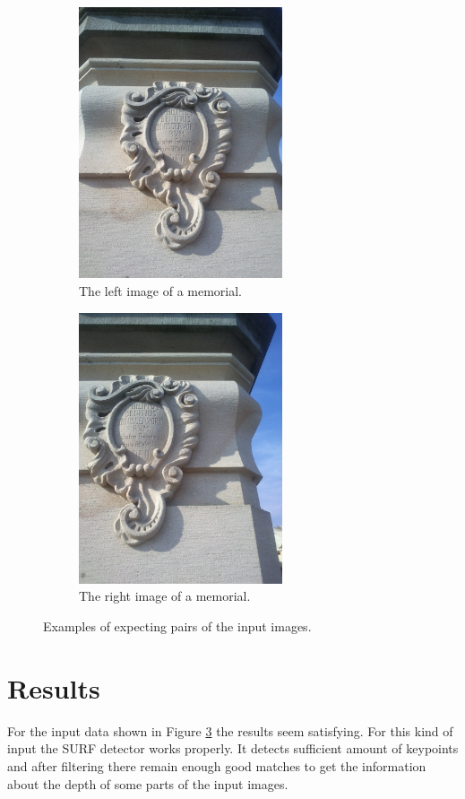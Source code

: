\begin{figure}[H]
\begin{subfigure}[b]{0.45\textwidth}
\centering
\includegraphics[width=6.0cm]{img/memorial_a.png}
\caption{The left image of a memorial.} \label{3}
\end{subfigure}
\begin{subfigure}[b]{0.45\textwidth}
\centering
\includegraphics[width=6.0cm]{img/memorial_b.png}
\caption{The right image of a memorial.} \label{4}
\end{subfigure}

\caption[]{Examples of expecting pairs of the input images.} 
\label{fig:input_samples}
\end{figure}


\section{Results}
For the input data shown in Figure \ref{fig:input_samples} the results seem satisfying.
For this kind of input the SURF detector works properly.
It detects sufficient amount of keypoints and after filtering there remain enough good matches to get the information about the depth of some parts of the input images.


